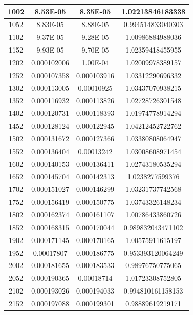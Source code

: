 \documentclass{article}
\begin{document}
\begin{longtable}{|c|c|c|c|}
		1002	&   8.53E-05	  & 8.35E-05	 &  1.02213846183338   \\ \hline
		1052	&   8.83E-05	  & 8.88E-05	 &  0.994514833040303   \\ \hline
		1102	&   9.37E-05	  & 9.28E-05	 &  1.00986884988036   \\ \hline
		1152	&   9.93E-05	  & 9.70E-05	 &  1.02359418455955   \\ \hline
		1202	&   0.000102006	  & 1.00E-04	 &  1.02009978389157   \\ \hline
		1252	&   0.000107358	  & 0.000103916	 &  1.03312290696332   \\ \hline
		1302	&   0.000113005	  & 0.00010925	 &  1.03437070938215   \\ \hline
		1352	&   0.000116932	  & 0.000113826	 &  1.02728726301548   \\ \hline
		1402	&   0.000120731	  & 0.000118393	 &  1.01974778914294   \\ \hline
		1452	&   0.000128124	  & 0.000122945	 &  1.04212452722762   \\ \hline
		1502	&   0.000131672	  & 0.000127366	 &  1.03380808064947   \\ \hline
		1552	&   0.000136404	  & 0.00013242	 &  1.03008608971454   \\ \hline
		1602	&   0.000140153	  & 0.000136411	 &  1.02743180535294   \\ \hline
		1652	&   0.000145704	  & 0.000142313	 &  1.0238277599376   \\ \hline
		1702	&   0.000151027	  & 0.000146299	 &  1.03231737742568   \\ \hline
		1752	&   0.000156419	  & 0.000150775	 &  1.03743326148234   \\ \hline
		1802	&   0.000162374	  & 0.000161107	 &  1.00786433860726   \\ \hline
		1852	&   0.000168315	  & 0.000170044	 &  0.989832043471102   \\ \hline
		1902	&   0.000171145	  & 0.000170165	 &  1.00575911615197   \\ \hline
		1952	&   0.00017807	  & 0.000186775	 &  0.953393120064249   \\ \hline
		2002	&   0.000181655	  & 0.000183533	 &  0.98976750775065   \\ \hline
		2052	&   0.000190365	  & 0.00018714	 &  1.01723308752805   \\ \hline
		2102	&   0.000193026	  & 0.000194033	 &  0.994810161158153   \\ \hline
		2152	&   0.000197088	  & 0.000199301	 &  0.98889619219171   \\ \hline

\end{longtable}
\end{document}
